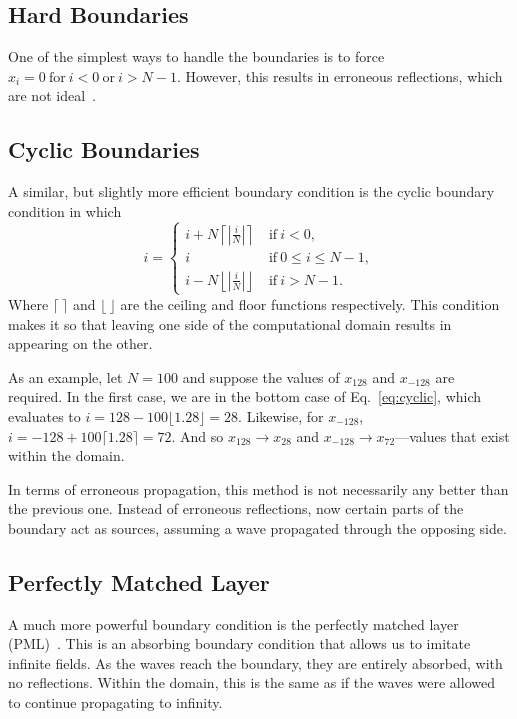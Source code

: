 \documentclass[12pt,twocolumn]{article}
\begin{document}
\subsection{Hard Boundaries}
One of the simplest ways to handle the boundaries is to force ${x_i=0~\mathrm{for}~i<0~\mathrm{or}~i>N-1}$. However, this results in erroneous reflections, which are not ideal~\cite{Sullivan00}.
\subsection{Cyclic Boundaries}
A similar, but slightly more efficient boundary condition is the cyclic boundary condition in which
\begin{equation}
\label{eq:cyclic}
i=\begin{cases}
i+N\left\lceil\left|{\frac{i}{N}}\right|\right\rceil~&\mathrm{if}~i<0,\\
i~&\mathrm{if}~0\leq i\leq N-1,\\
i-N\left\lfloor\left|{\frac{i}{N}}\right|\right\rfloor~&\mathrm{if}~i>N-1.
\end{cases}
\end{equation}
Where $\lceil~\rceil$ and $\lfloor~\rfloor$ are the ceiling and floor functions respectively. This condition makes it so that leaving one side of the computational domain results in appearing on the other.

As an example, let $N=100$ and suppose the values of $x_{128}$ and $x_{-128}$ are required. In the first case, we are in the bottom case of Eq.~\ref{eq:cyclic}, which evaluates to $i=128-100\lfloor 1.28 \rfloor=28$. Likewise, for $x_{-128}$, $i=-128+100\lceil1.28\rceil=72$. And so $x_{128}\rightarrow x_{28}$ and $x_{-128}\rightarrow x_{72}$---values that exist within the domain.

In terms of erroneous propagation, this method is not necessarily any better than the previous one. Instead of erroneous reflections, now certain parts of the boundary act as sources, assuming a wave propagated through the opposing side.
\subsection{Perfectly Matched Layer}
A much more powerful boundary condition is the perfectly matched layer (PML)~\cite{Berenger94}. This is an absorbing boundary condition that allows us to imitate infinite fields. As the waves reach the boundary, they are entirely absorbed, with no reflections. Within the domain, this is the same as if the waves were allowed to continue propagating to infinity.
\end{document}
